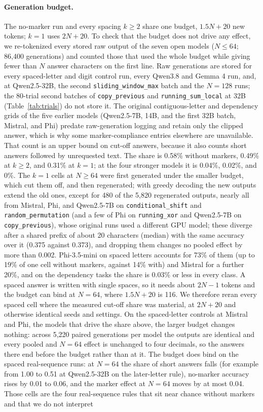 \documentclass[10pt]{article} %
\newcommand{\task}[1]{\texttt{#1}}
\begin{document}
\paragraph{Generation budget.} The no-marker run and every spacing $k \ge 2$ share one budget, $1.5N + 20$ new tokens; $k = 1$ uses $2N + 20$. To check that the budget does not drive any effect, we re-tokenized every stored raw output of the seven open models ($N \le 64$; 86,400 generations) and counted those that used the whole budget while giving fewer than $N$ answer characters on the first line. Raw generations are stored for every spaced-letter and digit control run, every Qwen3.8 and Gemma 4 run, and, at Qwen2.5-32B, the second \task{sliding\_window\_max} batch and the $N = 128$ runs; the 80-trial second batches of \task{copy\_previous} and \task{running\_sum\_local} at 32B (Table~\ref{tab:trials}) do not store it. The original contiguous-letter and dependency grids of the five earlier models (Qwen2.5-7B, 14B, and the first 32B batch, Mistral, and Phi) predate raw-generation logging and retain only the clipped answer, which is why some marker-compliance entries elsewhere are unavailable. That count is an upper bound on cut-off answers, because it also counts short answers followed by unrequested text. The share is 0.58\% without markers, 0.49\% at $k \ge 2$, and 0.31\% at $k = 1$; at the four stronger models it is 0.04\%, 0.02\%, and 0\%. The $k = 1$ cells at $N \ge 64$ were first generated under the smaller budget, which cut them off, and then regenerated; with greedy decoding the new outputs extend the old ones, except for 480 of the 5,820 regenerated outputs, nearly all from Mistral, Phi, and Qwen2.5-7B on \task{conditional\_shift} and \task{random\_permutation} (and a few of Phi on \task{running\_xor} and Qwen2.5-7B on \task{copy\_previous}), whose original runs used a different GPU model; these diverge after a shared prefix of about 20 characters (median) with the same accuracy over it (0.375 against 0.373), and dropping them changes no pooled effect by more than 0.002. Phi-3.5-mini on spaced letters accounts for 73\% of them (up to 19\% of one cell without markers, against 14\% with) and Mistral for a further 20\%, and on the dependency tasks the share is 0.03\% or less in every class. A spaced answer is written with single spaces, so it needs about $2N - 1$ tokens and the budget can bind at $N = 64$, where $1.5N + 20$ is 116. We therefore reran every spaced cell where the measured cut-off share was material, at $2N + 20$ and otherwise identical seeds and settings. On the spaced-letter controls at Mistral and Phi, the models that drive the share above, the larger budget changes nothing: across 5,220 paired generations per model the outputs are identical and every pooled and $N = 64$ effect is unchanged to four decimals, so the answers there end before the budget rather than at it. The budget does bind on the spaced real-sequence runs: at $N = 64$ the share of short answers falls (for example from 1.00 to 0.51 at Qwen2.5-32B on the later-letter rule), no-marker accuracy rises by 0.01 to 0.06, and the marker effect at $N = 64$ moves by at most 0.04. Those cells are the four real-sequence rules that sit near chance without markers and that we do not interpret 
\end{document}

